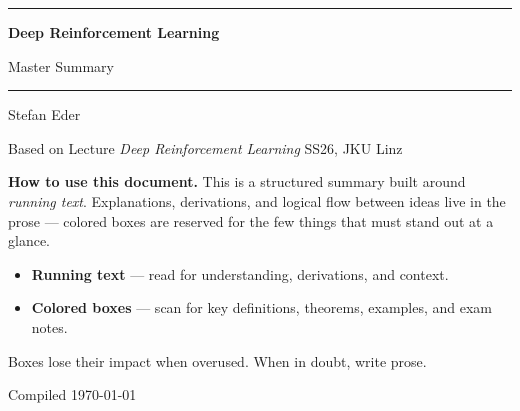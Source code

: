 \documentclass[11pt, oneside]{book}
\newcommand{\coursetitle}{Deep Reinforcement Learning}
\newcommand{\documenttype}{Master Summary}
\newcommand{\authorname}{Stefan Eder}
\newcommand{\basedon}{Based on Lecture \emph{Deep Reinforcement Learning} SS26, JKU Linz}
\begin{document}
\frontmatter  %


\thispagestyle{empty}
\vspace*{1.8cm}

\begin{center}
  {\color{accent}\rule{\linewidth}{1.8pt}}
  \vspace{0.65cm}

  {\fontsize{28}{34}\selectfont\bfseries\color{accent}\coursetitle\par}
  \vspace{0.25cm}
  {\large\color{gray!80!black}\documenttype\par}

  \vspace{0.55cm}
  {\color{accent!35}\rule{\linewidth}{0.5pt}}
  \vspace{0.55cm}

  {\large\authorname\par}
  \vspace{0.2cm}
  {\small\color{gray!70}\basedon\par}
\end{center}

\vspace{1.6cm}

\begin{center}
\begin{minipage}{0.84\textwidth}
  \small\color{gray!80!black}
  \textbf{How to use this document.}\enspace
  This is a structured summary built around \emph{running text}.
  Explanations, derivations, and logical flow between ideas live
  in the prose — colored boxes are reserved for the few things
  that must stand out at a glance.

  \medskip
  \begin{itemize}
    \item \textbf{Running text} — read for understanding, derivations, and context.
    \item \textbf{Colored boxes} — scan for key definitions, theorems, examples, and exam notes.
  \end{itemize}

  \smallskip
  Boxes lose their impact when overused. When in doubt, write prose.
\end{minipage}
\end{center}

\vfill
{\centering\small\color{gray!65} Compiled \today\par}
\clearpage
\end{document}
